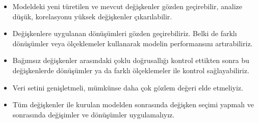 \documentclass[
]{article}
\begin{document}
\begin{itemize}
\item
  Modeldeki yeni türetilen ve mevcut değişkenler gözden geçirebilir,
  analize düşük, korelasyonu yüksek değişkenler çıkarılabilir.
\item
  Değişkenlere uygulanan dönüşümleri gözden geçirebiliriz. Belki de
  farklı dönüşümler veya ölçeklemeler kullanarak modelin performansını
  artırabiliriz.
\item
  Bağımsız değişkenler arasındaki çoklu doğrusallığı kontrol ettikten
  sonra bu değişkenlerde dönüşümler ya da farklı ölçeklemeler ile
  kontrol sağlayabiliriz.
\item
  Veri setini genişletmeli, mümkünse daha çok gözlem değeri elde
  etmeliyiz.
\item
  Tüm değişkenler ile kurulan modelden sonrasında değişken seçimi
  yapmalı ve sonrasında değişimler ve dönüşümler uygulamalıyız.
\end{itemize}
\end{document}
